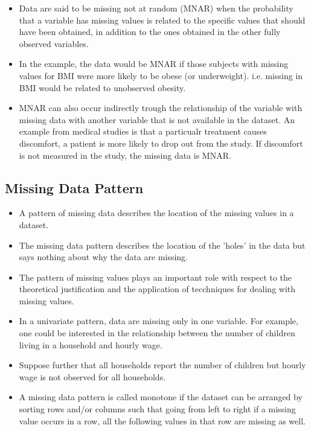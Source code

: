\documentclass[11pt]{article}
\theoremstyle{break}
\begin{document}
\begin{definition}[MNAR]
    \begin{itemize}
        \item Data are said to be missing not at random (MNAR) when the
            probability that a variable has missing values is related to
            the specific values that should have been obtained, in addition
            to the ones obtained in the other fully observed variables.
        \item In the example, the data would be MNAR if those subjects with
            missing values for BMI were more likely to be obese (or
            underweight). i.e. missing in BMI would be related to unobserved
            obesity.
        \item MNAR can also occur indirectly trough the relationship of the
            variable with missing data with another variable that is not
            available in the dataset. An example from medical studies is
            that a particualr treatment causes discomfort, a patient
            is more likely to drop out from the study. If discomfort is not
            measured in the study, the missing data is MNAR.
        \end{itemize}
\end{definition}



\subsection{Missing Data Pattern}
\begin{itemize}
    \item A pattern of missing data describes the location of the missing values in a
dataset. \item  The missing data pattern describes the location of the 'holes'
in the data but says nothing about why the data are missing.
\item The pattern of missing values plays an important role with respect to the
theoretical justification and the application of tecchniques for
dealing with missing values.
\item In a univariate pattern, data are missing only in one variable. For example,
one could be interested in the relationship between the number of children
living in a household and hourly wage.
\item Suppose further that all households report the number of children but hourly
wage is not observed for all households.
\item A missing data pattern is called monotone if the dataset can be
    arranged by sorting rows and/or columns such that going from left to
    right if a missing value occurs in a row, all the following values in
    that row are missing as well.
\end{itemize}
\end{document}
